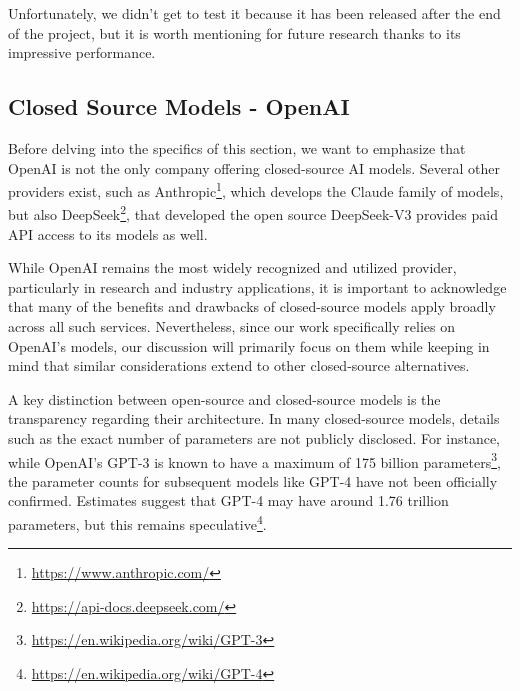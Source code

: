 Unfortunately, we didn't get to test it because it has been released after the end
of the project, but it is worth mentioning for future research thanks to its
impressive performance.

\subsection{Closed Source Models - OpenAI}
\label{sub:closed_source_models_openai}

Before delving into the specifics of this section, we want to emphasize that
OpenAI is not the only company offering closed-source AI models. Several other providers
exist, such as Anthropic\footnote{\url{https://www.anthropic.com/}}, which
develops the Claude family of models, but also DeepSeek\footnote{\url{https://api-docs.deepseek.com/}},
that developed the open source DeepSeek-V3 provides paid API access to its models
as well.

While OpenAI remains the most widely recognized and utilized provider,
particularly in research and industry applications, it is important to acknowledge
that many of the benefits and drawbacks of closed-source models apply broadly across
all such services. Nevertheless, since our work specifically relies on OpenAI's models,
our discussion will primarily focus on them while keeping in mind that similar
considerations extend to other closed-source alternatives.

\vspace{1mm}

A key distinction between open-source and closed-source models is the transparency
regarding their architecture. In many closed-source models, details such as the exact
number of parameters are not publicly disclosed. For instance, while OpenAI's GPT-3\cite{brown2020languagemodelsfewshotlearners}
is known to have a maximum of 175 billion parameters\footnote{\url{https://en.wikipedia.org/wiki/GPT-3}},
the parameter counts for subsequent models like GPT-4\cite{openai2024gpt4technicalreport}
have not been officially confirmed. Estimates suggest that GPT-4 may have around
1.76 trillion parameters, but this remains speculative\footnote{\url{https://en.wikipedia.org/wiki/GPT-4}}.

